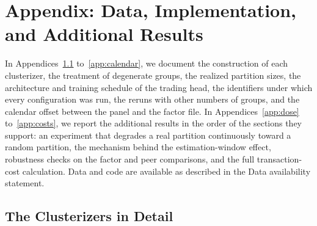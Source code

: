 \section{Appendix: Data, Implementation, and Additional Results}
\label{app:supp}

In Appendices~\ref{app:rules} to~\ref{app:calendar}, we document the construction of each clusterizer, the treatment of degenerate groups, the realized partition sizes, the architecture and training schedule of the trading head, the identifiers under which every configuration was run, the reruns with other numbers of groups, and the calendar offset between the panel and the factor file. In Appendices~\ref{app:dose} to~\ref{app:costs}, we report the additional results in the order of the sections they support: an experiment that degrades a real partition continuously toward a random partition, the mechanism behind the estimation-window effect, robustness checks on the factor and peer comparisons, and the full transaction-cost calculation. Data and code are available as described in the Data availability statement.

\subsection{The Clusterizers in Detail}
\label{app:rules}

